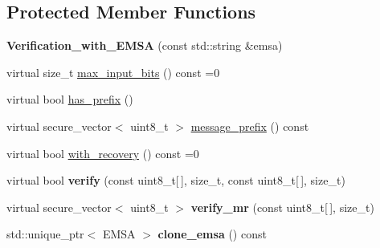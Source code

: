 \subsection*{Protected Member Functions}
\begin{DoxyCompactItemize}
\item 
\mbox{\label{class_botan_1_1_p_k___ops_1_1_verification__with___e_m_s_a_a788556388604a8c3c37273928b13390b}} 
{\bfseries Verification\+\_\+with\+\_\+\+E\+M\+SA} (const std\+::string \&emsa)
\item 
virtual size\+\_\+t \mbox{\hyperlink{class_botan_1_1_p_k___ops_1_1_verification__with___e_m_s_a_ad5c4d57d0767bfb77e7395c4c3dd40b6}{max\+\_\+input\+\_\+bits}} () const =0
\item 
virtual bool \mbox{\hyperlink{class_botan_1_1_p_k___ops_1_1_verification__with___e_m_s_a_a8671e55d073dfcd21b837be2de9fa0ec}{has\+\_\+prefix}} ()
\item 
virtual secure\+\_\+vector$<$ uint8\+\_\+t $>$ \mbox{\hyperlink{class_botan_1_1_p_k___ops_1_1_verification__with___e_m_s_a_a0a610d689e3156019bbaf55e73f90128}{message\+\_\+prefix}} () const
\item 
virtual bool \mbox{\hyperlink{class_botan_1_1_p_k___ops_1_1_verification__with___e_m_s_a_a75ab60a7d1bc3a457df0e881edad5af4}{with\+\_\+recovery}} () const =0
\item 
\mbox{\label{class_botan_1_1_p_k___ops_1_1_verification__with___e_m_s_a_ae71b00cbe06a4c42855081c8780bcd4d}} 
virtual bool {\bfseries verify} (const uint8\+\_\+t\mbox{[}$\,$\mbox{]}, size\+\_\+t, const uint8\+\_\+t\mbox{[}$\,$\mbox{]}, size\+\_\+t)
\item 
\mbox{\label{class_botan_1_1_p_k___ops_1_1_verification__with___e_m_s_a_a63dcde1f0e7d1d5bbfcf0e7abe333e18}} 
virtual secure\+\_\+vector$<$ uint8\+\_\+t $>$ {\bfseries verify\+\_\+mr} (const uint8\+\_\+t\mbox{[}$\,$\mbox{]}, size\+\_\+t)
\item 
\mbox{\label{class_botan_1_1_p_k___ops_1_1_verification__with___e_m_s_a_a6033b7f949d330b9200a39f5500b8a3a}} 
std\+::unique\+\_\+ptr$<$ E\+M\+SA $>$ {\bfseries clone\+\_\+emsa} () const
\end{DoxyCompactItemize}


